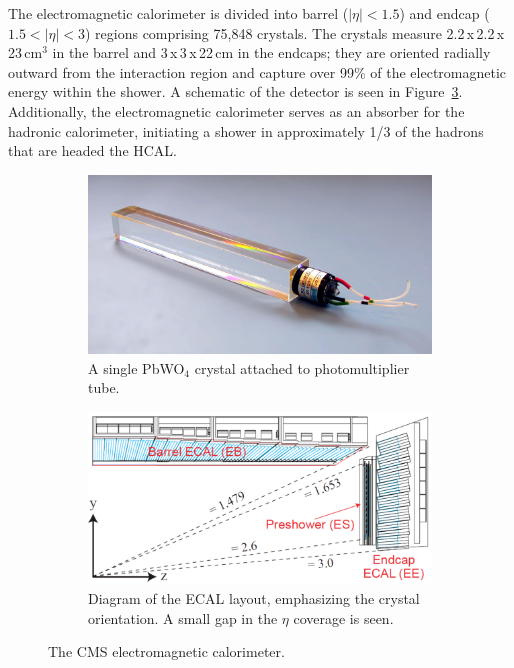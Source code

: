 The electromagnetic calorimeter is divided into barrel ($|\eta|<1.5$) and endcap ($1.5<|\eta|<3$) regions comprising 75,848 crystals. The crystals measure 2.2$\,$x$\,$2.2$\,$x$\,$23$\,$cm$^{3}$ in the barrel and 3$\,$x$\,$3$\,$x$\,$22$\,$cm in the endcaps; they are oriented radially outward from the interaction region and capture over 99\% of the electromagnetic energy within the shower. A schematic of the detector is seen in Figure~\ref{fig:ecal}. Additionally, the electromagnetic calorimeter serves as an absorber for the hadronic calorimeter, initiating a shower in approximately 1/3 of the hadrons that are headed the HCAL.

\begin{figure}
\centering
\begin{subfigure}[b]{0.35\textwidth}
\includegraphics[width=\textwidth]{figs/ecalcrystal.jpg}
\caption{A single PbWO$_{4}$ crystal attached to photomultiplier tube.}
\label{fig:ecalcrystal}
\end{subfigure}
\begin{subfigure}[b]{0.625\textwidth}
\includegraphics[width=\textwidth]{figs/ecal.png}
\caption{Diagram of the ECAL layout, emphasizing the crystal orientation. A small gap in the $\eta$ coverage is seen.}
\label{fig:ecal}
\end{subfigure}
\caption{The CMS electromagnetic calorimeter.}
\end{figure}

